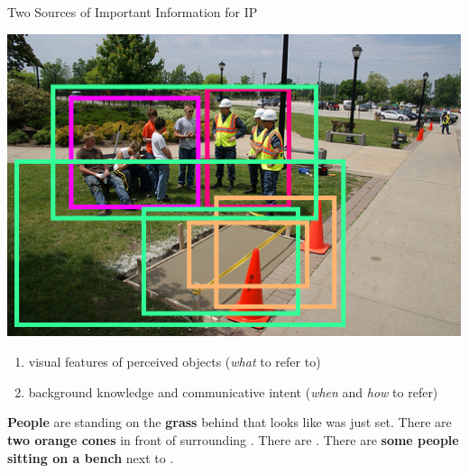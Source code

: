 \documentclass[notes=hide]{beamer}
\begin{document}
\begin{frame}{Two Sources of Important Information for IP}
\small
\begin{minipage}{0.5\textwidth}
\includegraphics[width=1\textwidth]{2327613boxes}
\end{minipage} \hfill
\begin{minipage}{0.45\textwidth}
\begin{enumerate}
\item visual features of perceived objects (\textit{what} to refer to)
\item background knowledge and communicative intent (\textit{when} and \textit{how} to refer)
\end{enumerate}
\end{minipage}
\begin{block}{}
\textcolor{firstsent}{\textbf{People}} are standing on the \textcolor{firstsent}{\textbf{grass}} behind  that looks like  was just set. There are \textcolor{secondsent}{\textbf{two orange cones}} in front of   surrounding . There are . There are \textcolor{fourthsent}{\textbf{some people sitting on a bench}} next to .
\end{block}
\end{frame}
\end{document}
